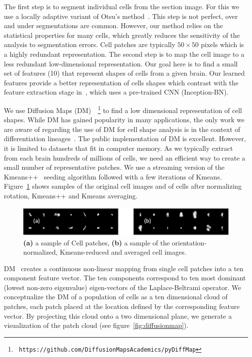 \documentclass[runningheads]{llncs}
\begin{document}
The first step is to segment individual cells from the section
image. For this we use a locally adaptive variant of
Otsu's method~\cite{otsu1979threshold}. This step is not perfect, over and under segmentations are
common. However, our method relies on the statistical properties for
many cells, which greatly reduces the sensitivity of the analysis to
segmentation errors. 
Cell patches are typically $50\times 50$ pixels which is a highly
redundant representation. The second step is to
map the cell image to a less redundant low-dimensional representation. Our goal here
is to find a small set of features (10) that represent shapes of cells
from a given brain. Our learned features provide a better representation 
of cells shapes which contrast with the feature extraction stage in~\cite{chen2019active}, 
which uses a pre-trained CNN (Inception-BN). 


We use Diffusion Maps
(DM)~\cite{belkin2003,coifman2005geometric}~\footnote{{\tt
    https://github.com/DiffusionMapsAcademics/pyDiffMap}} to find a
low dimensional representation of cell shapes. While DM has gained
popularity in many applications, the only work we are aware of
regarding the use of DM for cell shape analysis is in the context of
differentiation lineages~\cite{haghverdi2015diffusion}.
The public implementation of DM is excellent. However, it is limited to datasets that
fit in computer memory. As we typically extract from each brain
hundreds of millions of cells, we need an efficient way to create a
small number of representative patches.  We use a streaming version of
the Kmeans++~\cite{arthur2006k} seeding algorithm followed with a few
iterations of Kmeans. Figure~\ref{fig:kmeans} shows samples of the
original cell images and of cells after normalizing
rotation, Kmeans++ and Kmeans averaging.
\begin{figure}[t]
  \includegraphics[width=\textwidth]{Images/CellImages.png}
\caption{{\bf (a)} a sample of Cell patches,
  {\bf (b)}  a sample of the orientation-normalized, Kmeans-reduced and averaged cell images.}
\label{fig:kmeans}
\end{figure}

DM~\cite{coifman2005geometric} creates a continuous
non-linear mapping from single cell patches into a ten component
feature vector. The ten components correspond to ten most dominant
(lowest non-zero eigenvalue) eigen-vectors of the Laplace-Beltrami
operator. We conceptualize the DM of a population of cells as
a ten dimensional cloud of patches, each patch placed at the location
defined by the corresponding feature vector. By projecting this cloud
onto a two dimensional plane, we generate a visualization of the patch
cloud (see figure~\ref{fig:diffusionmap}).
\end{document}
